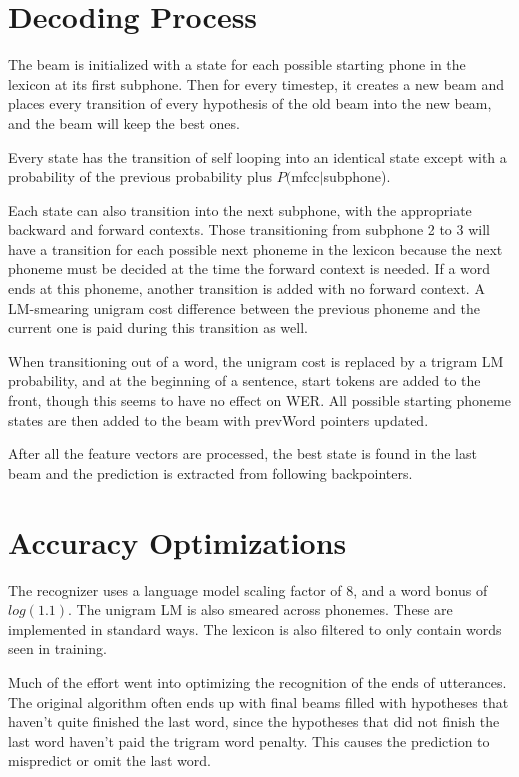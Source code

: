 \documentclass[11pt]{article}
\begin{document}
\section{Decoding Process}

The beam is initialized with a state for each possible starting phone in the lexicon at its first subphone. Then for every timestep, it creates a new beam and places every transition of every hypothesis of the old beam into the new beam, and the beam will keep the best ones. 

Every state has the transition of self looping into an identical state except with a probability of the previous probability plus $P($mfcc$|$subphone).

Each state can also transition into the next subphone, with the appropriate backward and forward contexts. Those transitioning from subphone 2 to 3 will have a transition for each possible next phoneme in the lexicon because the next phoneme must be decided at the time the forward context is needed. If a word ends at this phoneme, another transition is added with no forward context. A LM-smearing unigram cost difference between the previous phoneme and the current one is paid during this transition as well.

When transitioning out of a word, the unigram cost is replaced by a trigram LM probability, and at the beginning of a sentence, start tokens are added to the front, though this seems to have no effect on WER. All possible starting phoneme states are then added to the beam with prevWord pointers updated.

After all the feature vectors are processed, the best state is found in the last beam and the prediction is extracted from following backpointers. 

\section{Accuracy Optimizations}

The recognizer uses a language model scaling factor of 8, and a word bonus of $log(1.1)$. The unigram LM is also smeared across phonemes. These are implemented in standard ways. The lexicon is also filtered to only contain words seen in training.

Much of the effort went into optimizing the recognition of the ends of utterances. The original algorithm often ends up with final beams filled with hypotheses that haven't quite finished the last word, since the hypotheses that did not finish the last word haven't paid the trigram word penalty. This causes the prediction to mispredict or omit the last word. 
\end{document}
